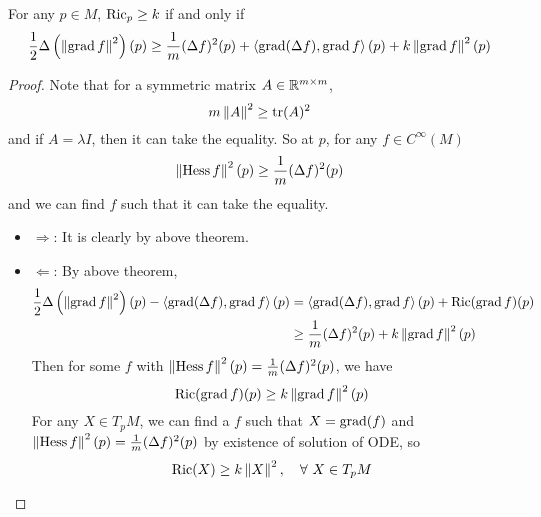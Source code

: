 \begin{enumerate}[label=\arabic{*}.]
	\begin{cor}
		For any $p \in M$, $\operatorname{Ric}_p \geq k$ if and only if
		\begin{equation*}
			\frac{1}{2}\Delta\left(\left\lVert\operatorname{grad}f\right\lVert^2\right)(p) \geq \frac{1}{m}(\Delta f)^2(p) + \left\langle \operatorname{grad}(\Delta f),\operatorname{grad} f \right\rangle(p) + k\left\lVert\operatorname{grad}f\right\lVert^2(p)
		\end{equation*}
	\end{cor}
	\begin{proof}
		Note that for a symmetric matrix $A \in \mathbb{R}^{m\times m}$,
		\begin{equation*}
			m\left\lVert A\right\lVert^2 \geq \operatorname{tr}(A)^2
		\end{equation*}
		and if $A = \lambda I$, then it can take the equality. So at $p$, for any $f \in C^{\infty}(M)$
		\begin{equation*}
			\left\lVert\operatorname{Hess}f\right\lVert^2(p)\geq\frac{1}{m}(\Delta f)^2(p)
		\end{equation*}
		and we can find $f$ such that it can take the equality.
		\begin{itemize}
			\item $\Rightarrow$: It is clearly by above theorem.

			\item $\Leftarrow$: By above theorem,
			\begin{equation*}
				\begin{aligned}
					\frac{1}{2}\Delta\left(\left\lVert\operatorname{grad}f\right\lVert^2\right)(p) -\left\langle \operatorname{grad}(\Delta f),\operatorname{grad} f \right\rangle(p) &=  \left\langle \operatorname{grad}(\Delta f),\operatorname{grad} f \right\rangle(p) + \operatorname{Ric}(\operatorname{grad}f)(p) \\
					&\geq \frac{1}{m}(\Delta f)^2(p) +k\left\lVert\operatorname{grad}f\right\lVert^2(p)
				\end{aligned}
			\end{equation*}
			Then for some $f$ with $\left\lVert\operatorname{Hess}f\right\lVert^2(p)=\frac{1}{m}(\Delta f)^2(p)$, we have
			\begin{equation*}
				\operatorname{Ric}(\operatorname{grad}f)(p) \geq k\left\lVert\operatorname{grad}f\right\lVert^2(p)
			\end{equation*}
			For any $X \in T_pM$, we can find a $f$ such that $X = \operatorname{grad}(f)$ and $\left\lVert\operatorname{Hess}f\right\lVert^2(p)=\frac{1}{m}(\Delta f)^2(p)$ by existence of solution of ODE, so
			\begin{equation*}
				\operatorname{Ric}(X) \geq k\left\lVert X\right\lVert^2,\quad \forall~X \in T_pM \qedhere
			\end{equation*}
		\end{itemize}
	\end{proof}
\end{enumerate}

